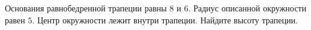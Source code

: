 \begin{ex}
	\begin{condition}
		Основания равнобедренной трапеции равны \( 8  \) и \( 6 \). Радиус описанной окружности равен \( 5 \). Центр окружности лежит внутри трапеции. Найдите высоту трапеции.
	\end{condition}
\end{ex}